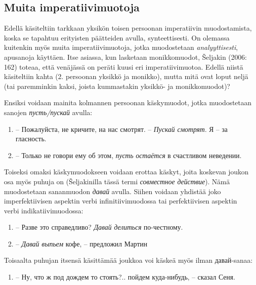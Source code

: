 \documentclass[]{scrartcl}
\providecommand{\tightlist}{%
  \setlength{\itemsep}{0pt}\setlength{\parskip}{0pt}}
\begin{document}
\subsection{Muita imperatiivimuotoja}\label{muita-imperatiivimuotoja}

Edellä käsiteltiin tarkkaan yksikön toisen persoonan imperatiivin
muodostamista, koska se tapahtuu erityisten päätteiden avulla,
synteettisesti. On olemassa kuitenkin myös muita imperatiivimuotoja,
jotka muodostetaan \emph{analyyttisesti}, apusanoja käyttäen. Itse
asiassa, kun lasketaan monikkomuodot, Šeljakin (2006: 162) toteaa, että
venäjässä on peräti kuusi eri imperatiivimuotoa. Edellä niistä
käsiteltiin kahta (2. persoonan yksikkö ja monikko), mutta mitä ovat
loput neljä (tai paremminkin kaksi, joista kummastakin yksikkö- ja
monikkomuodot)?

Ensiksi voidaan mainita kolmannen persoonan käskymuodot, jotka
muodostetaan sanojen \emph{пусть/пускай} avulla:

\begin{enumerate}
\def\labelenumi{(\arabic{enumi})}
\setcounter{enumi}{355}
\tightlist
\item
  -- Пожалуйста, не кричите, на нас смотрят. -- \emph{Пускай смотрят}. Я
  -- за гласность.
\item
  -- Только не говори ему об этом, \emph{пусть остаётся} в счастливом
  неведении.
\end{enumerate}

Toiseksi omaksi käskymuodokseen voidaan erottaa käskyt, joita koskevan
joukon osa myös puhuja on (Šeljakinilla tässä termi \emph{совместное
действие}). Nämä muodostetaan sananmuodon \emph{давай} avulla. Siihen
voidaan yhdistää joko imperfektiivisen aspektin verbi
infinitiivimuodossa tai perfektiivisen aspektin verbi
indikatiivimuodossa:

\begin{enumerate}
\def\labelenumi{(\arabic{enumi})}
\setcounter{enumi}{357}
\tightlist
\item
  -- Разве это справедливо? \emph{Давай делиться} по-честному.
\item
  -- \emph{Давай выпьем} кофе, -- предложил Мартин
\end{enumerate}

Toisaalta puhujan itsensä käsittämää joukkoa voi käskeä myös ilman
давай-sanaa:

\begin{enumerate}
\def\labelenumi{(\arabic{enumi})}
\setcounter{enumi}{359}
\tightlist
\item
  -- Ну, что ж под дождем то стоять?.. пойдем куда-нибудь, -- сказал
  Сеня.
\end{enumerate}
\end{document}
